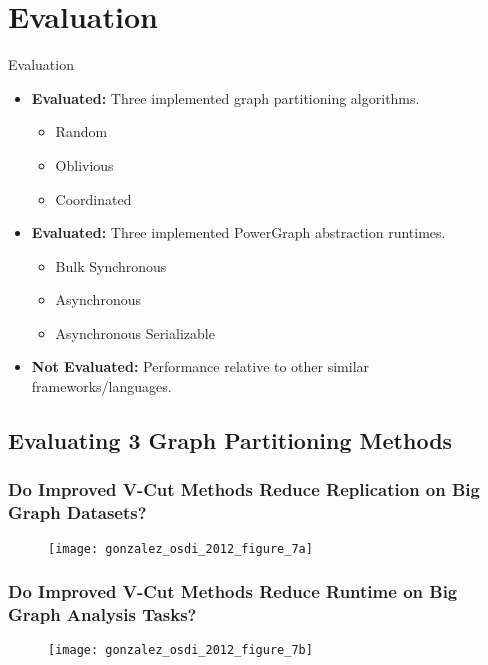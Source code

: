 \section{Evaluation}

\begin{frame}{Evaluation}
  \begin{itemize}
    \item \textbf{Evaluated:} Three implemented graph partitioning algorithms.
          \begin{itemize}
            \item Random
            \item Oblivious
            \item Coordinated
          \end{itemize}
    \item \textbf{Evaluated:} Three implemented PowerGraph abstraction runtimes.
          \begin{itemize}
            \item{Bulk Synchronous}
            \item{Asynchronous}
            \item{Asynchronous Serializable}
          \end{itemize}
    \item \textbf{Not Evaluated:} Performance relative to other similar
          frameworks/languages.
  \end{itemize}
\end{frame}


\subsection{Evaluating 3 Graph Partitioning Methods}

\begin{frame}
  \frametitle{\small{Do Improved V-Cut Methods Reduce Replication on Big Graph
              Datasets?}}
  \centering
  \begin{figure}
    \texttt{[image: gonzalez\_osdi\_2012\_figure\_7a]}
    \caption{\cite[OSDI '12]{gonzalez2012powergraph}}
  \end{figure}
\end{frame}

\begin{frame}
  \frametitle{\small{Do Improved V-Cut Methods Reduce Runtime on Big Graph
              Analysis Tasks?}}
  \centering
  \begin{figure}
    \texttt{[image: gonzalez\_osdi\_2012\_figure\_7b]}
    \caption{\cite[OSDI '12]{gonzalez2012powergraph}}
  \end{figure}
\end{frame}

